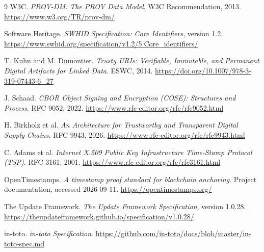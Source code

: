 \documentclass[11pt]{article}
\begin{document}
\begin{thebibliography}{9}
W3C. \emph{PROV-DM: The PROV Data Model}. W3C Recommendation, 2013. \url{https://www.w3.org/TR/prov-dm/}

Software Heritage. \emph{SWHID Specification: Core Identifiers}, version 1.2. \url{https://www.swhid.org/specification/v1.2/5.Core_identifiers/}

T. Kuhn and M. Dumontier. \emph{Trusty URIs: Verifiable, Immutable, and Permanent Digital Artifacts for Linked Data}. ESWC, 2014. \url{https://doi.org/10.1007/978-3-319-07443-6_27}

J. Schaad. \emph{CBOR Object Signing and Encryption (COSE): Structures and Process}. RFC 9052, 2022. \url{https://www.rfc-editor.org/rfc/rfc9052.html}

H. Birkholz et al. \emph{An Architecture for Trustworthy and Transparent Digital Supply Chains}. RFC 9943, 2026. \url{https://www.rfc-editor.org/rfc/rfc9943.html}

C. Adams et al. \emph{Internet X.509 Public Key Infrastructure Time-Stamp Protocol (TSP)}. RFC 3161, 2001. \url{https://www.rfc-editor.org/rfc/rfc3161.html}

OpenTimestamps. \emph{A timestamp proof standard for blockchain anchoring}.
Project documentation, accessed 2026-09-11. \url{https://opentimestamps.org/}

The Update Framework. \emph{The Update Framework Specification}, version 1.0.28. \url{https://theupdateframework.github.io/specification/v1.0.28/}

in-toto. \emph{in-toto Specification}. \url{https://github.com/in-toto/docs/blob/master/in-toto-spec.md}
\end{thebibliography}
\end{document}
